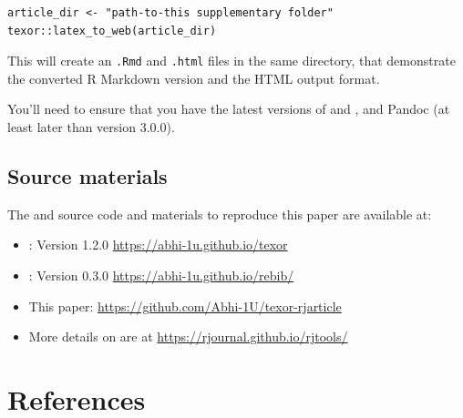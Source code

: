 \begin{verbatim}
article_dir <- "path-to-this supplementary folder"
texor::latex_to_web(article_dir)
\end{verbatim}

This will create an \texttt{.Rmd} and \texttt{.html} files in the same directory, that demonstrate the converted R Markdown version and the HTML output format.

You'll need to ensure that you have the latest versions of  and , and Pandoc (at least later than version 3.0.0).

\hypertarget{source-materials}{%
\subsection*{Source materials}\label{source-materials}}

The  and  source code and materials to reproduce this paper are available at:

\begin{itemize}
\tightlist
\item
  : Version 1.2.0 \url{https://abhi-1u.github.io/texor}
\item
  : Version 0.3.0 \url{https://abhi-1u.github.io/rebib/}
\item
  This paper: \url{https://github.com/Abhi-1U/texor-rjarticle}
\item
  More details on  are at \url{https://rjournal.github.io/rjtools/}
\end{itemize}

\hypertarget{references}{%
\section*{References}\label{references}}

